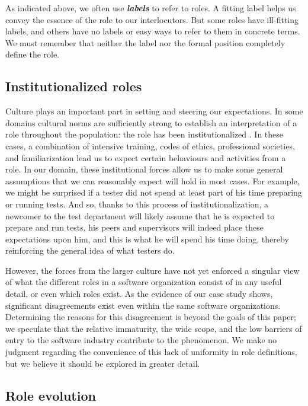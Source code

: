 \documentclass[10pt, conference, compsocconf]{IEEEtran}
\begin{document}
As indicated above, we often use \textbf{\emph{labels}} to refer to roles. A fitting label helps us convey the essence of the role to our interlocutors. But some roles have ill-fitting labels, and others have no labels or easy ways to refer to them in concrete terms. We must remember that neither the label nor the formal position completely define the role.


\subsection{Institutionalized roles}

Culture plays an important part in setting and steering our expectations. In some domains cultural norms are sufficiently strong to establish an interpretation of a role throughout the population: the role has been institutionalized \cite{DiMaggio1991}. In these cases, a combination of intensive training, codes of ethics, professional societies, and familiarization lead us to expect certain behaviours and activities from a role. In our domain, these institutional forces allow us to make some general assumptions that we can reasonably expect will hold in most cases. For example, we might be surprised if a tester did not spend at least part of his time preparing or running tests. And so, thanks to this process of institutionalization, a newcomer to the test department will likely assume that he is expected to prepare and run tests, his peers and supervisors will indeed place these expectations upon him, and this is what he will spend his time doing, thereby reinforcing the general idea of what testers do.

However, the forces from the larger culture have not yet enforced a singular view of what the different roles in a software organization consist of in any useful detail, or even which roles exist. As the evidence of our case study shows, significant disagreements exist even within the same software organizations. Determining the reasons for this disagreement is beyond the goals of this paper; we speculate that the relative immaturity, the wide scope, and the low barriers of entry to the software industry contribute to the phenomenon. We make no judgment regarding the convenience of this lack of uniformity in role definitions, but we believe it should be explored in greater detail.


\subsection{Role evolution}
\end{document}
